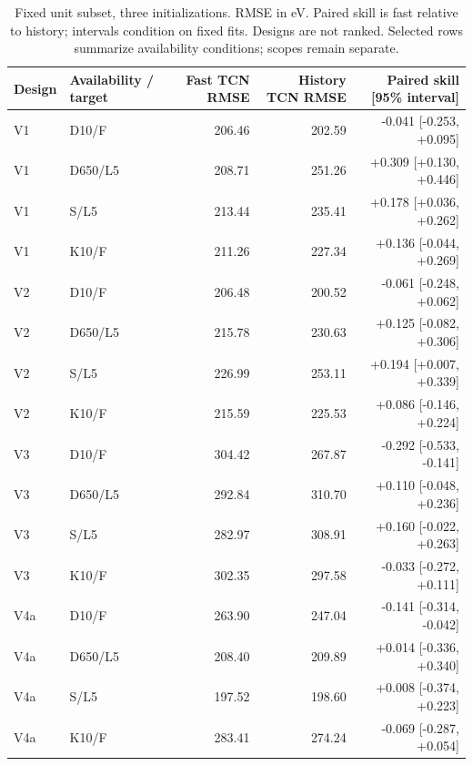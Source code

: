 \begin{table}[t]
\centering\scriptsize
\begin{tabular}{llrrr}\toprule
Design & Availability / target & Fast TCN RMSE & History TCN RMSE & Paired skill [95\% interval]\\\midrule
V1 & D10/F & 206.46 & 202.59 & -0.041 [-0.253, +0.095]\\
V1 & D650/L5 & 208.71 & 251.26 & +0.309 [+0.130, +0.446]\\
V1 & S/L5 & 213.44 & 235.41 & +0.178 [+0.036, +0.262]\\
V1 & K10/F & 211.26 & 227.34 & +0.136 [-0.044, +0.269]\\
V2 & D10/F & 206.48 & 200.52 & -0.061 [-0.248, +0.062]\\
V2 & D650/L5 & 215.78 & 230.63 & +0.125 [-0.082, +0.306]\\
V2 & S/L5 & 226.99 & 253.11 & +0.194 [+0.007, +0.339]\\
V2 & K10/F & 215.59 & 225.53 & +0.086 [-0.146, +0.224]\\
V3 & D10/F & 304.42 & 267.87 & -0.292 [-0.533, -0.141]\\
V3 & D650/L5 & 292.84 & 310.70 & +0.110 [-0.048, +0.236]\\
V3 & S/L5 & 282.97 & 308.91 & +0.160 [-0.022, +0.263]\\
V3 & K10/F & 302.35 & 297.58 & -0.033 [-0.272, +0.111]\\
V4a & D10/F & 263.90 & 247.04 & -0.141 [-0.314, -0.042]\\
V4a & D650/L5 & 208.40 & 209.89 & +0.014 [-0.336, +0.340]\\
V4a & S/L5 & 197.52 & 198.60 & +0.008 [-0.374, +0.223]\\
V4a & K10/F & 283.41 & 274.24 & -0.069 [-0.287, +0.054]\\
\bottomrule\end{tabular}
\caption{Fixed unit subset, three initializations. RMSE in eV. Paired skill is fast relative to history; intervals condition on fixed fits. Designs are not ranked. Selected rows summarize availability conditions; scopes remain separate.}
\end{table}
